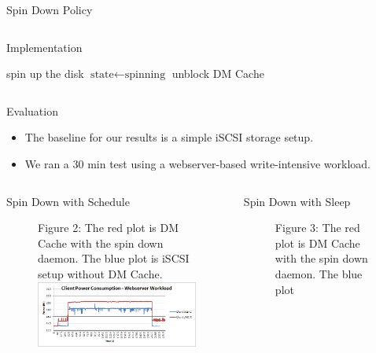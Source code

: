 \documentclass[final]{beamer}
\newlength{\onecolwid}
\newlength{\twocolwid}
\begin{document}
\begin{frame}[t]
\begin{columns}[t]
\begin{column}{\twocolwid}
\begin{alertblock}{Spin Down Policy}
\begin{column}{\onecolwid}
\begin{block}{Implementation}
\begin{algorithmic}[1]
					    \State spin up the disk
					    \State $\text{state} \gets \text{spinning}$
					    \State unblock DM Cache
					\EndIf
				    \EndIf
				\EndWhile
			    \EndProcedure
			\end{algorithmic}
		    \end{block}
		\end{column}
	    \end{alertblock}
	    \begin{block}{Evaluation}
		\begin{itemize}
		    \item The baseline for our results is a simple iSCSI storage setup.
		    \item We ran a 30 min test using a webserver-based write-intensive workload.
		\end{itemize}
	    \end{block}
	    \begin{columns}[t,totalwidth=\twocolwid]
		\begin{column}{\onecolwid}
		    \begin{block}{Spin Down with Schedule}
			\begin{figure}
			    \raggedright Figure 2: The red plot is DM Cache with the spin down daemon. The blue plot
			    is iSCSI setup without DM Cache. \\
			    \vspace{15pt}
			    \centering \includegraphics[scale=1]{image.png}
			    \label{fig:results}
			\end{figure}
		    \end{block}
		\end{column}
		\begin{column}{\onecolwid}
		    \begin{block}{Spin Down with Sleep}
			\begin{figure}
			    \raggedright Figure 3: The red plot is DM Cache with the spin down daemon. The blue plot

\end{figure}
\end{block}
\end{column}
\end{columns}
\end{column}
\end{columns}
\end{frame}
\end{document}
